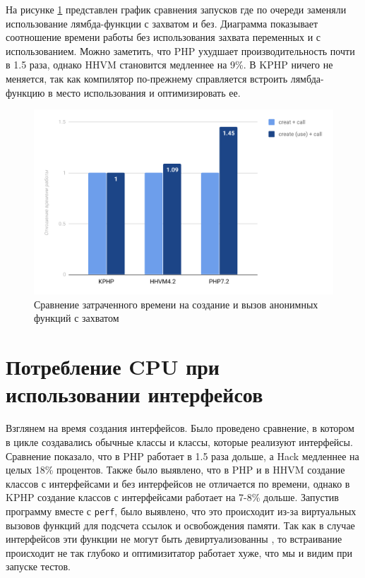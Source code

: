 На рисунке \ref{fig:benchmark-create_use_call-simple} представлен график сравнения запусков где по очереди заменяли использование лямбда-функции с захватом и без.
Диаграмма показывает соотношение времени работы без использования захвата переменных и с использованием.
Можно заметить, что PHP ухудшает производительность почти в 1.5 раза, однако HHVM становится медленнее на 9\%.
В KPHP ничего не меняется, так как компилятор по-прежнему справляется встроить лямбда-функцию в место использования и оптимизировать ее.
\begin{figure}[H]
    \caption{Сравнение затраченного времени на создание и вызов анонимных функций с захватом}
    \label{fig:benchmark-create_use_call-simple}
    \centering
    \includegraphics[width=\linewidth]{images/benchmark_create_use_call_simple}
\end{figure}

\section{Потребление CPU при использовании интерфейсов}
Взглянем на время создания интерфейсов.
Было проведено сравнение, в котором в цикле создавались обычные классы и классы, которые реализуют интерфейсы.
Сравнение показало, что в PHP работает в 1.5 раза дольше, а Hack медленнее на целых 18\% процентов.
Также было выявлено, что в PHP и в HHVM создание классов с интерфейсами и без интерфейсов не отличается по времени,
однако в KPHP создание классов с интерфейсами работает на 7-8\% дольше.
Запустив программу вместе с \verb|perf|, было выявлено, что это происходит из-за виртуальных вызовов функций для подсчета ссылок и освобождения памяти.
Так как в случае интерфейсов эти функции не могут быть девиртуализованны \cite{devirtualization}, то встраивание происходит не так глубоко и оптимизитатор работает хуже, что мы и видим при запуске тестов.

